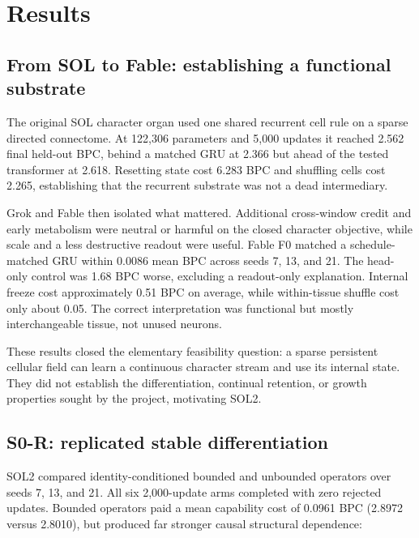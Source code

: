 \documentclass[11pt]{article}
\newcommand{\soltwo}{\textsf{SOL2}}
\begin{document}
\section{Results}

\subsection{From SOL to Fable: establishing a functional substrate}

The original SOL character organ used one shared recurrent cell rule on a sparse directed
connectome. At 122,306 parameters and 5,000 updates it reached 2.562 final held-out BPC,
behind a matched GRU at 2.366 but ahead of the tested transformer at 2.618. Resetting
state cost 6.283 BPC and shuffling cells cost 2.265, establishing that the recurrent
substrate was not a dead intermediary.

Grok and Fable then isolated what mattered. Additional cross-window credit and early
metabolism were neutral or harmful on the closed character objective, while scale and a
less destructive readout were useful. Fable F0 matched a schedule-matched GRU within
0.0086 mean BPC across seeds 7, 13, and 21. The head-only control was 1.68 BPC worse,
excluding a readout-only explanation. Internal freeze cost approximately 0.51 BPC on
average, while within-tissue shuffle cost only about 0.05. The correct interpretation
was functional but mostly interchangeable tissue, not unused neurons.

These results closed the elementary feasibility question: a sparse persistent cellular
field can learn a continuous character stream and use its internal state. They did not
establish the differentiation, continual retention, or growth properties sought by the
project, motivating \soltwo{}.

\subsection{S0-R: replicated stable differentiation}

\soltwo{} compared identity-conditioned bounded and unbounded operators over seeds 7,
13, and 21. All six 2,000-update arms completed with zero rejected updates. Bounded
operators paid a mean capability cost of 0.0961 BPC (2.8972 versus 2.8010), but produced
far stronger causal structural dependence:
\end{document}
